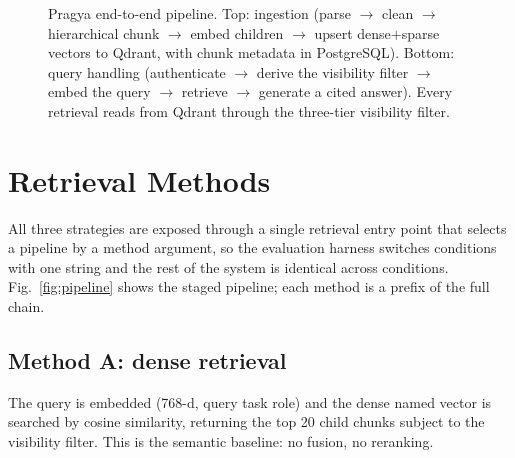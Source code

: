 \documentclass[conference]{IEEEtran}
\begin{document}
\begin{figure}[t]
\caption{Pragya end-to-end pipeline. Top: ingestion (parse $\rightarrow$ clean
$\rightarrow$ hierarchical chunk $\rightarrow$ embed children $\rightarrow$ upsert
dense$+$sparse vectors to Qdrant, with chunk metadata in PostgreSQL). Bottom:
query handling (authenticate $\rightarrow$ derive the visibility filter
$\rightarrow$ embed the query $\rightarrow$ retrieve $\rightarrow$ generate a
cited answer). Every retrieval reads from Qdrant through the three-tier
visibility filter.}
\label{fig:system}
\end{figure}

\section{Retrieval Methods}
\label{sec:methods}
All three strategies are exposed through a single retrieval entry point that
selects a pipeline by a method argument, so the evaluation harness switches
conditions with one string and the rest of the system is identical across
conditions. Fig.~\ref{fig:pipeline} shows the staged pipeline; each method is a
prefix of the full chain.

\subsection{Method A: dense retrieval}
The query is embedded (768-d, query task role) and the dense named vector is
searched by cosine similarity, returning the top 20 child chunks subject to the
visibility filter. This is the semantic baseline: no fusion, no reranking.
\end{document}
